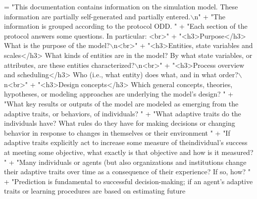 \begin{DoxyCode}
= \textcolor{stringliteral}{"This documentation contains information on the simulation model. These information are partially
       self-generated and partially entered.\(\backslash\)n"}        
                                             + \textcolor{stringliteral}{"The information is grouped according to the protocol ODD. "}
                                             + \textcolor{stringliteral}{"Each section of the protocol answers some questions. In
       particular: <br>"}
                                             + \textcolor{stringliteral}{"<h3>Purpose</h3> What is the purpose of the model?\(\backslash\)n<br>"}
                                             + \textcolor{stringliteral}{"<h3>Entities, state variables and scales</h3> What kinds of
       entities are in the model? By what state variables, or attributes, are these entities characterized?\(\backslash\)n<br>"}
                                             + \textcolor{stringliteral}{"<h3>Process overview and scheduling</h3> Who (i.e., what
       entity) does what, and in what order?\(\backslash\)n<br>"}
                                             + \textcolor{stringliteral}{"<h3>Design concepts</h3> Which general concepts, theories,
       hypotheses, or modeling approaches are underlying the model's design? "}
                                             +                            \textcolor{stringliteral}{"What key results or outputs of
       the model are modeled as emerging from the adaptive traits, or behaviors, of individuals? "}   
                                             +                            \textcolor{stringliteral}{"What adaptive traits do the
       individuals have? What rules do they have for making decisions or changing behavior in response to changes in
       themselves or their environment "}
                                             +                            \textcolor{stringliteral}{"If adaptive traits explicitly
       act to increase some measure of theindividual's success at meeting some objective, what exactly is that
       objective and how is it measured? "}
                                             +                            \textcolor{stringliteral}{"Many individuals or agents (but
       also organizations and institutions change their adaptive traits over time as a consequence of their
       experience? If so, how? "}
                                             +                            \textcolor{stringliteral}{"Prediction is fundamental to
       successful decision-making; if an agent's adaptive traits or learning procedures are based on estimating future
}
\end{DoxyCode}
